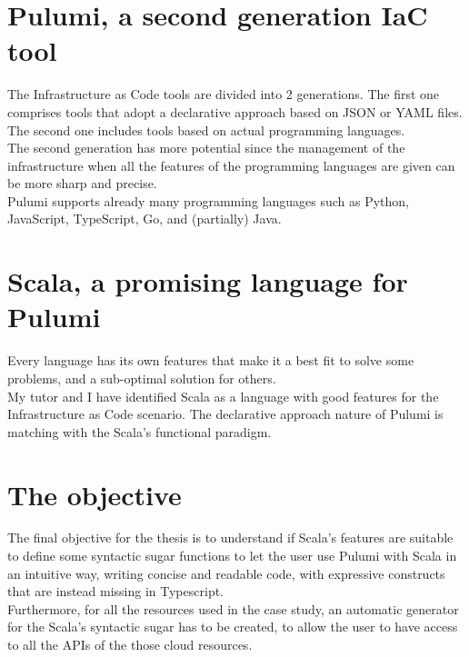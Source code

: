 \section{Pulumi, a second generation IaC tool}
The Infrastructure as Code tools are divided into 2 generations.
The first one comprises tools that adopt a declarative approach based on JSON or YAML files.
The second one includes tools based on actual programming languages.\\
The second generation has more potential since the management of the infrastructure when all the features of the programming languages are given can be more sharp and precise.\\
Pulumi supports already many programming languages such as Python, JavaScript, TypeScript, Go, and (partially) Java.

\section{Scala, a promising language for Pulumi}
Every language has its own features that make it a best fit to solve some problems, and a sub-optimal solution for others.\\
My tutor and I have identified Scala as a language with good features for the Infrastructure as Code scenario.
The declarative approach nature of Pulumi is matching with the Scala's functional paradigm.

\section{The objective}
The final objective for the thesis is to understand if Scala's features are suitable to define some syntactic sugar functions to let the user use Pulumi with Scala in an intuitive way, writing concise and readable code, with expressive constructs that are instead missing in Typescript.\\
Furthermore, for all the resources used in the case study, an automatic generator for the Scala's syntactic sugar has to be created, to allow the user to have access to all the APIs of the those cloud resources.



